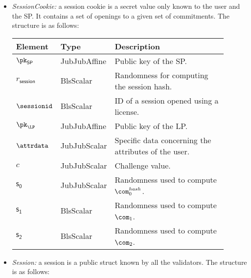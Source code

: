 \begin{itemize}
	\item \emph{SessionCookie:} a session cookie is a secret value only known to the user and the SP. It contains a set of openings to a given set of commitments. The structure is as follows:
	
	
		
	\vspace{0.1cm}
	\begin{center}
		\begin{tabular}{ | p{0.15\linewidth} | p{0.2\linewidth} | p{0.55\linewidth} | } 
			\hline
			{Element} & {Type} & {Description} \\
			\hline
			$\pk_{\mathsf{SP}}$ & JubJubAffine & Public key of the SP. \\
			$r_\mathsf{session}$ & BlsScalar & Randomness for computing the session hash. \\
			$\sessionid$ & BlsScalar & ID of a session opened using a license. \\ 
			$\pk_{\LP}$ & JubJubAffine & Public key of the LP. \\ 
			$\attrdata$ & JubJubScalar & Specific data concerning the attributes of the user. \\ 
			$c$ & JubJubScalar & Challenge value. \\ 
			$\mathsf{s_0}$ & JubJubScalar & Randomness used to compute $\com_0^{hash}$. \\
			$\mathsf{s_1}$ & BlsScalar & Randomness used to compute $\com_1$. \\
			$\mathsf{s_2}$ & BlsScalar & Randomness used to compute $\com_2$. \\
			\hline
		\end{tabular}
	\end{center}	

	\item \emph{Session:} a session is a public struct known by all the validators. The structure is as follows:
	
	

\end{itemize}
